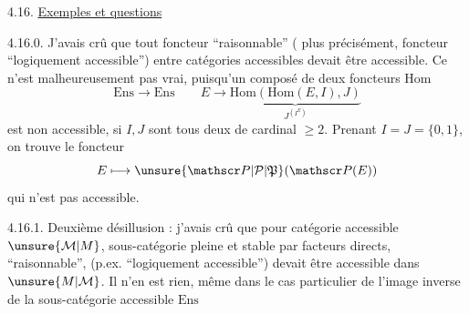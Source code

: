 
4.16. \uline{Exemples et questions}

4.16.0. J'avais crû que tout foncteur ``raisonnable'' ( plus précisément,  foncteur ``logiquement accessible'') entre catégories accessibles devait être accessible. Ce n'est malheureusement pas vrai, puisqu'un composé de deux foncteurs Hom
\[
\mathrm{Ens}\longrightarrow\mathrm{Ens}\qquad
E\to\underbrace{\mathrm{Hom}(\mathrm{Hom}(E,I),J)}_{J^{(I^E)}}
\]
est non accessible, si $I,J$ sont tous deux de cardinal $\geq2$. Prenant  $I=J=\{0,1\}$, on trouve le foncteur
\[
E\longmapsto\unsure{\mathscr P|\mathcal P|\mathfrak P}(\mathscr P(E))
\]
qui n'est pas accessible.

4.16.1. Deuxième désillusion : j'avais crû que pour  catégorie accessible $\unsure{\mathcal M|M}$,  sous-catégorie   pleine et stable par facteurs directs,
``raisonnable'',  (p.ex. ``logiquement accessible'') devait être accessible dans $\unsure{M|\mathcal M}$. Il n'en est rien,  même dans le cas particulier de l'image inverse de la sous-catégorie accessible  $\mathrm{Ens}$
